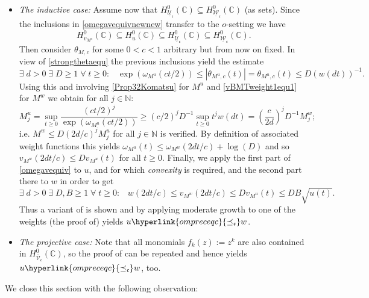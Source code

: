 \documentclass[10pt]{amsart}%
\numberwithin{equation}{section}
\theoremstyle{plain}
\newcommand{\CC}{\mathbb{C}}
\newcommand{\NN}{\mathbb{N}}
\begin{document}
\begin{itemize}
	\item[$(\ast)$] \emph{The inductive case:} Assume now that $H^{0}_{\underline{\mathcal{U}}_{\mathfrak{c}}}(\CC)\subseteq H^{0}_{\underline{\mathcal{W}}_{\mathfrak{c}}}(\CC)$ (as sets). Since the inclusions in \eqref{omegavequivnewnew} transfer to the $o$-setting we have
	$$H^{0}_{v_{M^u}}(\CC)\subseteq H^{0}_{u}(\CC)\subseteq H^{0}_{\underline{\mathcal{U}}_{\mathfrak{c}}}(\CC)\subseteq H^{0}_{\underline{\mathcal{W}}_{\mathfrak{c}}}(\CC).$$
	Then consider $\theta_{M,c}$ for some $0<c<1$ arbitrary but from now on fixed. In view of \eqref{strongthetaequ} the previous inclusions yield the estimate
	$$\exists\;d>0\;\exists\;D\ge 1\;\forall\;t\ge 0:\;\;\;\exp(\omega_{M^u}(ct/2))\le|\theta_{M^u,c}(t)|=\theta_{M^u,c}(t)\le D(w(dt))^{-1}.$$
	Using this and involving \eqref{Prop32Komatsu} for $M^u$ and \eqref{vBMTweight1equ1} for $M^w$ we obtain for all $j\in\NN$:
	$$M^u_j=\sup_{t\ge 0}\frac{(ct/2)^j}{\exp(\omega_{M^u}(ct/2))}\ge (c/2)^jD^{-1}\sup_{t\ge 0}t^jw(dt)=\left(\frac{c}{2d}\right)^jD^{-1}M^w_j;$$
	i.e. $M^w\le D(2d/c)^jM^u_j$ for all $j\in\NN$ is verified. By definition of associated weight functions this yields $\omega_{M^u}(t)\le\omega_{M^w}(2dt/c)+\log(D)$ and so $v_{M^w}(2dt/c)\le Dv_{M^u}(t)$ for all $t\ge 0$. Finally, we apply the first part of \eqref{omegavequiv} to $u$, and for which \emph{convexity} is required, and the second part there to $w$ in order to get
	$$\exists\;d>0\;\exists\;D,B\ge 1\;\forall\;t\ge 0:\;\;\;w(2dt/c)\le v_{M^w}(2dt/c)\le Dv_{M^u}(t)\le DB\sqrt{u(t)}.$$
	Thus a variant of \cite[$(3.36),(3.39)$]{weightedentirecharacterization} is shown and by applying moderate growth to one of the weights (the proof of) \cite[Prop. 3.22 $(ii)$]{weightedentirecharacterization} yields $u\hyperlink{ompreceqc}{\preceq_{\mathfrak{c}}}w$.

\item[$(\ast)$] {\itshape The projective case:} Note that all monomials $f_k(z):=z^k$ are also contained in $H^{0}_{\overline{\mathcal{V}}_{\mathfrak{c}}}(\CC)$, so the proof of \cite[Prop. 3.24]{weightedentirecharacterization} can be repeated and hence yields $u\hyperlink{ompreceqc}{\preceq_{\mathfrak{c}}}w$, too.
\end{itemize}

We close this section with the following observation:
\end{document}
